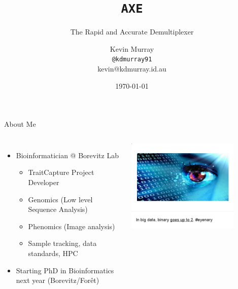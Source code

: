 \documentclass[t]{beamer}
\title{\texttt{AXE}}
\subtitle{The Rapid and Accurate Demultiplexer}
\author{Kevin Murray\\\tiny{\texttt{@kdmurray91}\\kevin@kdmurray.id.au}}
\institute{Borevitz Lab, ANU}
\date{\today}
\begin{document}
{
\begin{frame}
  \titlepage
  \vfill
\end{frame}
}


\begin{frame}{About Me}
  \begin{columns}[t]
    \begin{itemize}
      \item Bioinformatician @ Borevitz Lab
      \begin{itemize}
        \item TraitCapture Project Developer
        \item Genomics (Low level Sequence Analysis)
        \item Phenomics (Image analysis)
        \item Sample tracking, data standards, HPC
      \end{itemize}
      \item Starting PhD in Bioinformatics next year (Borevitz/For\^{e}t)
    \end{itemize}
    \begin{center}
      \includegraphics[width=0.8\textwidth]{img/bigdata.png}
    \end{center}
  \end{columns}
  \vfill
\end{frame}
\end{document}

